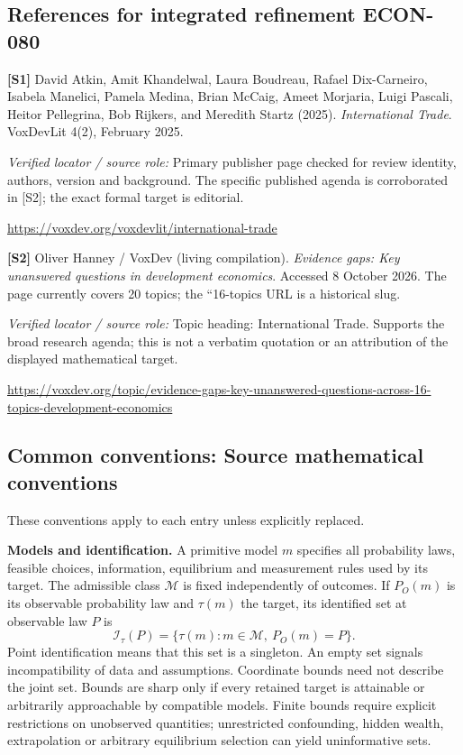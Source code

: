 \documentclass[11pt,a4paper]{article}
\begin{document}
\subsection*{References for integrated refinement ECON-080}
{\footnotesize\raggedright
\par\noindent\textbf{[S1]} David Atkin, Amit Khandelwal, Laura Boudreau, Rafael Dix-Carneiro, Isabela Manelici, Pamela Medina, Brian McCaig, Ameet Morjaria, Luigi Pascali, Heitor Pellegrina, Bob Rijkers, and Meredith Startz (2025). \emph{International Trade}. VoxDevLit 4(2), February 2025.\par \textit{Verified locator / source role:} Primary publisher page checked for review identity, authors, version and background. The specific published agenda is corroborated in [S2]; the exact formal target is editorial.\par \url{https://voxdev.org/voxdevlit/international-trade}\par\smallskip
\par\noindent\textbf{[S2]} Oliver Hanney / VoxDev (living compilation). \emph{Evidence gaps: Key unanswered questions in development economics}. Accessed 8 October 2026. The page currently covers 20 topics; the ``16-topics URL is a historical slug.\par \textit{Verified locator / source role:} Topic heading: International Trade. Supports the broad research agenda; this is not a verbatim quotation or an attribution of the displayed mathematical target.\par \url{https://voxdev.org/topic/evidence-gaps-key-unanswered-questions-across-16-topics-development-economics}\par\smallskip
}

\subsection*{Common conventions: Source mathematical conventions}

These conventions apply to each entry unless explicitly replaced.

\textbf{Models and identification.} A primitive model \(m\) specifies all probability laws, feasible choices, information, equilibrium and measurement rules used by its target. The admissible class \(\mathcal M\) is fixed independently of outcomes. If \(P_O(m)\) is its observable probability law and \(\tau(m)\) the target, its identified set at observable law \(P\) is
\[
 \mathcal I_\tau(P)=\{\tau(m):m\in\mathcal M,\ P_O(m)=P\}.
\]
Point identification means that this set is a singleton. An empty set signals incompatibility of data and assumptions. Coordinate bounds need not describe the joint set. Bounds are sharp only if every retained target is attainable or arbitrarily approachable by compatible models. Finite bounds require explicit restrictions on unobserved quantities; unrestricted confounding, hidden wealth, extrapolation or arbitrary equilibrium selection can yield uninformative sets.
\end{document}
